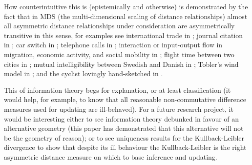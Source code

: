 \documentclass[12pt]{article}
\begin{document}
How counterintuitive this is (epistemically and otherwise) is
demonstrated by the fact that in MDS (the multi-dimensional scaling of
distance relationships) almost all asymmetric distance relationships
under consideration are asymmetrically transitive in this sense, for
examples see international trade in ; journal
citation in ; car switch in
; telephone calls in
; interaction or input-output flow in
migration, economic activity, and social mobility in
; flight time between two cities in
; mutual intelligibility between Swedish
and Danish in ; Tobler's wind model in
; and the cyclist lovingly hand-sketched in
.

This  of information theory begs for explanation,
or at least classification (it would help, for example, to know that
all reasonable non-commutative difference measures used for updating
are ill-behaved). For a future research project, it would be
interesting either to see information theory debunked in favour of an
alternative geometry (this paper has demonstrated that this
alternative will not be the geometry of reason); or to see uniqueness
results for the Kullback-Leibler divergence to show that despite its
ill behaviour the Kullback-Leibler is the right asymmetric distance
measure on which to base inference and updating.



% 

 

\end{document}
